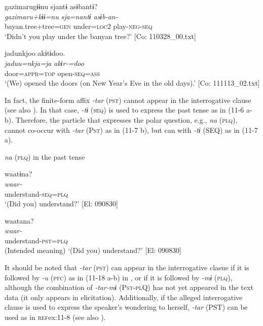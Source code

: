   \ex  
      \glll    gazimarugɨɨnu  sjantɨ  asɨbantɨ?\\
      \textit{gazimaru+kɨɨ=nu}  \textit{sja=nantɨ}  \textit{asɨb-an-}\\
      bayan.tree+tree=\textsc{gen}  under=\textsc{loc}2  play-\textsc{neg}-\textsc{seq}\\
      \glt       ‘Didn’t you play under the banyan tree?’ [Co: 110328\_00.txt]

  \ex  
      \glll    jadunkjoo  akɨtɨdoo.\\
      \textit{jaduu=nkja=ja}  \textit{akɨr-=doo}\\
      door=\textsc{appr}=\textsc{top}  open-\textsc{seq}=\textsc{ass}\\
      \glt       ‘(We) opened the doors (on New Year’s Eve in the old days).’ [Co: 111113\_02.txt]
\z
\z

  In fact, the finite-form affix \textit{{}-tar} (\textsc{pst}) cannot appear in the interrogative clause (see also ). In that case, \textit{{}-tɨ} (\textsc{seq}) is used to express the past tense as in (11-6 a-b). Therefore, the particle that expresses the polar question, e.g., \textit{na} (\textsc{plq}), cannot co-occur with \textit{{}-tar} (P\textsc{st}) as in (11-7 b), but can with \textit{{}-tɨ} (SEQ) as in (11-7 a).

\ea\label{ex:11-7}  \textit{na} (\textsc{plq}) in the past tense

  \ea  
      \glll    waatɨna?\\
      \textit{waar-}\\
      understand-\textsc{seq}=\textsc{plq}\\
      \glt       ‘(Did you) understand?’ [El: 090830]

  \ex  
      \glll    *waatana?\\
       \textit{waar-}\\
      understand-\textsc{pst}=\textsc{plq}\\
      \glt       (Intended meaning) ‘(Did you) understand?’ [El: 090830]
\z
\z

  It should be noted that \textit{{}-tar} (\textsc{pst}) can appear in the interrogative clasue if it is followed by \textit{{}-u} (\textsc{pfc}) as in (11-18 a-b) in , or if it is followed by \textit{{}-mɨ} (\textsc{plq}), although the combination of \textit{{}-tar-mɨ} (P\textsc{st}-\textsc{pl}Q) has not yet appeared in the text data (it only appears in elicitation). Additionally, if the alleged interrogative clause is used to express the speaker’s wondering to herself, \textit{{}-tar} (PST) can be used as in \textsc{ref}{ex:11-8} (see also ).

